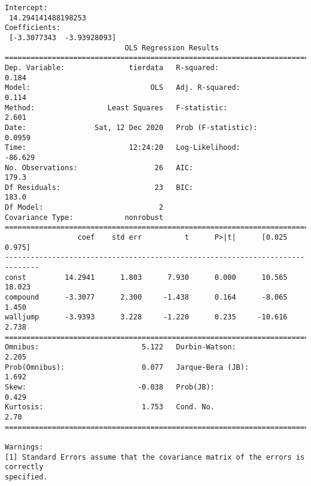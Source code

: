 \documentclass[11pt]{article}
\begin{document}
    \begin{Verbatim}[commandchars=\\\{\}]
Intercept:
 14.294141488198253
Coefficients:
 [-3.3077343  -3.93928093]
                            OLS Regression Results
==============================================================================
Dep. Variable:               tierdata   R-squared:                       0.184
Model:                            OLS   Adj. R-squared:                  0.114
Method:                 Least Squares   F-statistic:                     2.601
Date:                Sat, 12 Dec 2020   Prob (F-statistic):             0.0959
Time:                        12:24:20   Log-Likelihood:                -86.629
No. Observations:                  26   AIC:                             179.3
Df Residuals:                      23   BIC:                             183.0
Df Model:                           2
Covariance Type:            nonrobust
==============================================================================
                 coef    std err          t      P>|t|      [0.025      0.975]
------------------------------------------------------------------------------
const         14.2941      1.803      7.930      0.000      10.565      18.023
compound      -3.3077      2.300     -1.438      0.164      -8.065       1.450
walljump      -3.9393      3.228     -1.220      0.235     -10.616       2.738
==============================================================================
Omnibus:                        5.122   Durbin-Watson:                   2.205
Prob(Omnibus):                  0.077   Jarque-Bera (JB):                1.692
Skew:                          -0.038   Prob(JB):                        0.429
Kurtosis:                       1.753   Cond. No.                         2.70
==============================================================================

Warnings:
[1] Standard Errors assume that the covariance matrix of the errors is correctly
specified.
    \end{Verbatim}
\end{document}
